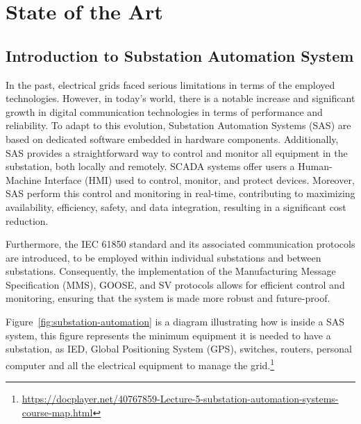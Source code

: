 
\chapter{State of the Art} %

\label{chap:Chapter2} %

\section{Introduction to Substation Automation System}
In the past, electrical grids faced serious limitations in terms of the employed technologies. However, in today's world, there is a notable increase and significant growth in digital communication technologies in terms of performance and reliability. To adapt to this evolution, Substation Automation Systems (SAS) are based on dedicated software embedded in hardware components. Additionally, SAS provides a straightforward way to control and monitor all equipment in the substation, both locally and remotely. SCADA systems offer users a Human-Machine Interface (HMI) used to control, monitor, and protect devices. Moreover, SAS perform this control and monitoring in real-time, contributing to maximizing availability, efficiency, safety, and data integration, resulting in a significant cost reduction.

Furthermore, the IEC 61850 standard and its associated communication protocols are introduced, to be employed within individual substations and between substations. Consequently, the implementation of the Manufacturing Message Specification (MMS), GOOSE, and SV protocols allows for efficient control and monitoring, ensuring that the system is made more robust and future-proof.

Figure~\ref{fig:substation-automation} is a diagram illustrating how is inside a SAS system, this figure  represents the minimum equipment it is needed to have a substation, as IED, Global Positioning System (GPS), switches, routers, personal computer and all the electrical equipment to manage the grid.\footnote{\url{https://docplayer.net/40767859-Lecture-5-substation-automation-systems-course-map.html}}

